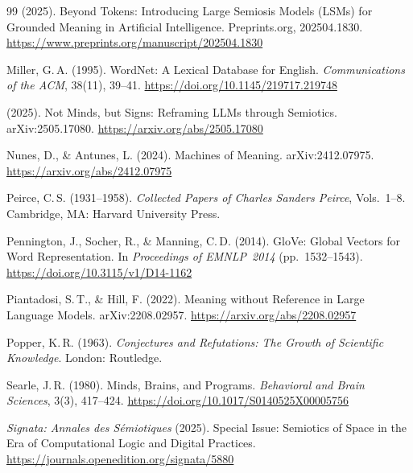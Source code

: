 \documentclass[12pt,a4paper]{article}
\begin{document}
\begin{thebibliography}{99}
(2025).
\newblock Beyond Tokens: Introducing Large Semiosis Models (LSMs) for Grounded
Meaning in Artificial Intelligence.
\newblock Preprints.org, 202504.1830.
\newblock \url{https://www.preprints.org/manuscript/202504.1830}

Miller, G.\,A. (1995).
\newblock WordNet: A Lexical Database for English.
\newblock \emph{Communications of the ACM}, 38(11), 39--41.
\newblock \url{https://doi.org/10.1145/219717.219748}

(2025).
\newblock Not Minds, but Signs: Reframing LLMs through Semiotics.
\newblock arXiv:2505.17080.
\newblock \url{https://arxiv.org/abs/2505.17080}

Nunes, D., \& Antunes, L. (2024).
\newblock Machines of Meaning.
\newblock arXiv:2412.07975.
\newblock \url{https://arxiv.org/abs/2412.07975}

Peirce, C.\,S. (1931--1958).
\newblock \emph{Collected Papers of Charles Sanders Peirce}, Vols.~1--8.
\newblock Cambridge, MA: Harvard University Press.

Pennington, J., Socher, R., \& Manning, C.\,D. (2014).
\newblock GloVe: Global Vectors for Word Representation.
\newblock In \emph{Proceedings of EMNLP~2014} (pp.~1532--1543).
\newblock \url{https://doi.org/10.3115/v1/D14-1162}

Piantadosi, S.\,T., \& Hill, F. (2022).
\newblock Meaning without Reference in Large Language Models.
\newblock arXiv:2208.02957.
\newblock \url{https://arxiv.org/abs/2208.02957}

Popper, K.\,R. (1963).
\newblock \emph{Conjectures and Refutations: The Growth of Scientific Knowledge}.
\newblock London: Routledge.

Searle, J.\,R. (1980).
\newblock Minds, Brains, and Programs.
\newblock \emph{Behavioral and Brain Sciences}, 3(3), 417--424.
\newblock \url{https://doi.org/10.1017/S0140525X00005756}

\emph{Signata: Annales des S\'emiotiques} (2025).
\newblock Special Issue: Semiotics of Space in the Era of Computational Logic
and Digital Practices.
\newblock \url{https://journals.openedition.org/signata/5880}


\end{thebibliography}
\end{document}
